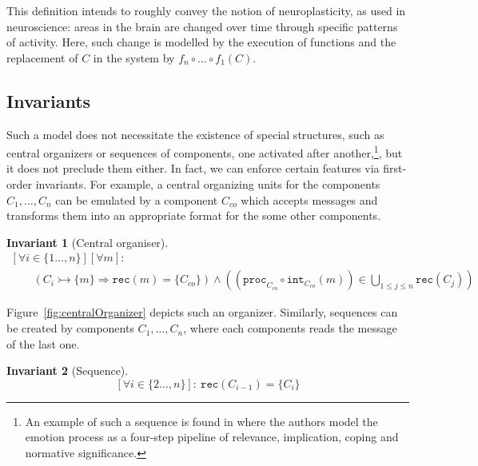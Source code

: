 \documentclass[]{scrartcl}
\theoremstyle{break}
\newtheorem{invariant}{Invariant}
\renewcommand{\tt}[1]{\texttt{#1}}
\newcommand{\cansend}[2]{#1 \rightarrowtail \{#2\}}
\newcommand{\rec}[1]{\tt{rec}(#1)}
\renewcommand{\int}[1]{\tt{int}_{#1}}
\newcommand{\proc}[1]{\tt{proc}_{#1}}
\begin{document}
This definition intends to roughly convey the notion of neuroplasticity, as used in neuroscience: areas in the brain are changed over time through specific patterns of activity. Here, such change is modelled by the execution of functions and the replacement of $C$ in the system by $f_n \circ \dots \circ f_1 (C)$.

\subsection{Invariants}

Such a model does not necessitate the existence of special structures, such as central organizers or sequences of components, one activated after another,\footnote{An example of such a sequence is found in \cite{} where the authors model the emotion process as a four-step pipeline of relevance, implication, coping and normative significance.}, but it does not preclude them either. In fact, we can enforce certain features via first-order invariants. For example, a central organizing units for the components $C_1,\dots,C_n$ can be emulated by a component $C_{co}$ which accepts messages and transforms them into an appropriate format for the some other components.

\begin{invariant}[Central organiser]
$$
	\begin{array}{l}
	 [\forall i \in \{1\dots,n\}] [\forall m]:\\
	 \quad \quad \left(\cansend{C_i}{m} \Rightarrow \rec{m} = \{C_{co}\}\right) \wedge \left( \left( \proc{C_{co}} \circ \int{C_{co}}(m)  \right) \in \bigcup\limits_{1 \leq j \leq n} \rec{C_j} \right)
	\end{array}
$$
\end{invariant}

Figure~\ref{fig:centralOrganizer} depicts such an organizer. Similarly, sequences can be created by components $C_{1},\dots,C_{n}$, where each components reads the message of the last one.

\begin{invariant}[Sequence]
$$
	[\forall i \in \{2\dots,n\}]:\ \rec{C_{i-1}} = \{C_i\}
$$
\end{invariant}
\end{document}
